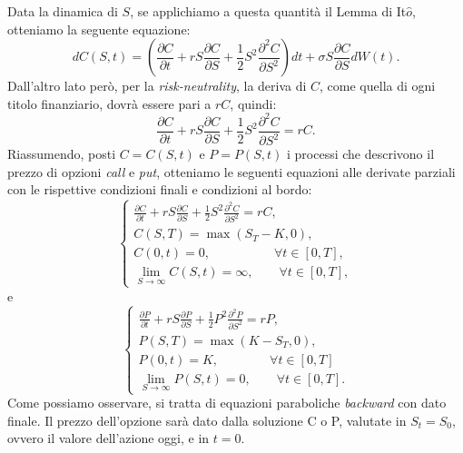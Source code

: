 \documentclass[a4paper,10pt]{report}
\newcommand{\der}[2]{\frac{\partial #1}{\partial #2}}
\newcommand{\dder}[2]{\frac{\partial^2 #1}{\partial #2^2}}
\theoremstyle{plain}
\theoremstyle{definition}
\theoremstyle{remark}
\begin{document}
Data la dinamica di $S$, se applichiamo a questa quantit\`a il Lemma di It$\hat{o}$, otteniamo la seguente equazione: $$dC(S,t)=\left(\der{C}{t}+r S \der{C}{S} +\frac{1}{2}S^2\dder{C}{S}\right)dt+\sigma S \der{C}{S}dW(t).$$
Dall'altro lato per\`o, per la \emph{risk-neutrality}, la deriva di $C$, come quella di ogni titolo finanziario, dovr\`a essere pari a $rC$, quindi:$$\der{C}{t}+r S \der{C}{S} +\frac{1}{2}S^2\dder{C}{S}=rC.$$
Riassumendo, posti $C=C(S,t)$ e $P=P(S,t)$ i processi che descrivono il prezzo di opzioni \emph{call} e \emph{put}, otteniamo le seguenti equazioni alle derivate parziali con le rispettive condizioni finali e condizioni al bordo:
\begin{equation}
\begin{cases}
\displaystyle
\der{C}{t}+r S \der{C}{S} +\frac{1}{2}S^2\dder{C}{S}=rC,\\
C(S,T)=\max(S_T-K,0),\\
C(0,t)=0,\qquad\quad\qquad\forall t\in[0,T],\\
\lim\limits_{S\to\infty}C(S,t)=\infty,\qquad\forall t\in[0,T],
\end{cases}
\label{callbs1d}
\end{equation}
e
\begin{equation}
\begin{cases}
\displaystyle
\der{P}{t}+r S \der{P}{S} +\frac{1}{2}P^2\dder{P}{S}=rP,\\
P(S,T)=\max(K-S_T,0),\\
P(0,t)=K,\qquad\qquad\forall t\in[0,T]\\
\lim\limits_{S\to\infty}P(S,t)=0,\qquad\forall t\in[0,T].
\end{cases}
\label{putbs1d}
\end{equation}
Come possiamo osservare, si tratta di equazioni paraboliche \emph{backward} con dato finale. Il prezzo dell'opzione sar\`a dato dalla soluzione C o P, valutate in $S_t=S_0$, ovvero il valore dell'azione oggi, e in $t=0$.
\end{document}
